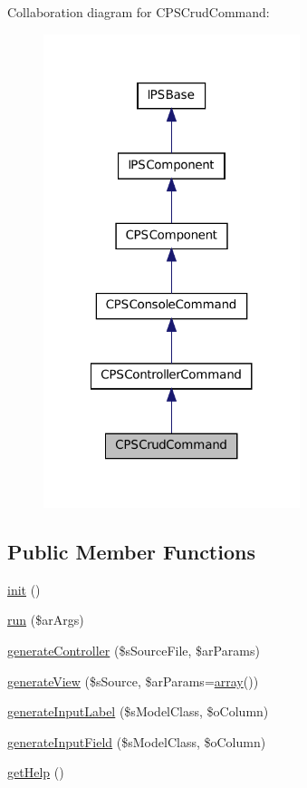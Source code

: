 Collaboration diagram for CPSCrudCommand:\nopagebreak
\begin{figure}[H]
\begin{center}
\leavevmode
\includegraphics[width=212pt]{classCPSCrudCommand__coll__graph}
\end{center}
\end{figure}
\subsection*{Public Member Functions}
\begin{DoxyCompactItemize}
\item 
\hyperlink{classCPSCrudCommand_a4be4055f3361d4800e16bc2e2e38cda6}{init} ()
\item 
\hyperlink{classCPSCrudCommand_a330e31e8c3572ce01a4e1c8485c6aedd}{run} (\$arArgs)
\item 
\hyperlink{classCPSCrudCommand_a49dc0a7897a19cca4729069259c39623}{generateController} (\$sSourceFile, \$arParams)
\item 
\hyperlink{classCPSCrudCommand_a81be02780978c8c023217c75e1dd863d}{generateView} (\$sSource, \$arParams=\hyperlink{list_8php_aa3205d038c7f8feb5c9f01ac4dfadc88}{array}())
\item 
\hyperlink{classCPSCrudCommand_a383b6e2ef409c302d0a231b05d7392a9}{generateInputLabel} (\$sModelClass, \$oColumn)
\item 
\hyperlink{classCPSCrudCommand_a3a57c7a7020dbfaab8ae96210650be3e}{generateInputField} (\$sModelClass, \$oColumn)
\item 
\hyperlink{classCPSCrudCommand_a4cc928ef4def3a84c181608d31bf7608}{getHelp} ()
\end{DoxyCompactItemize}
